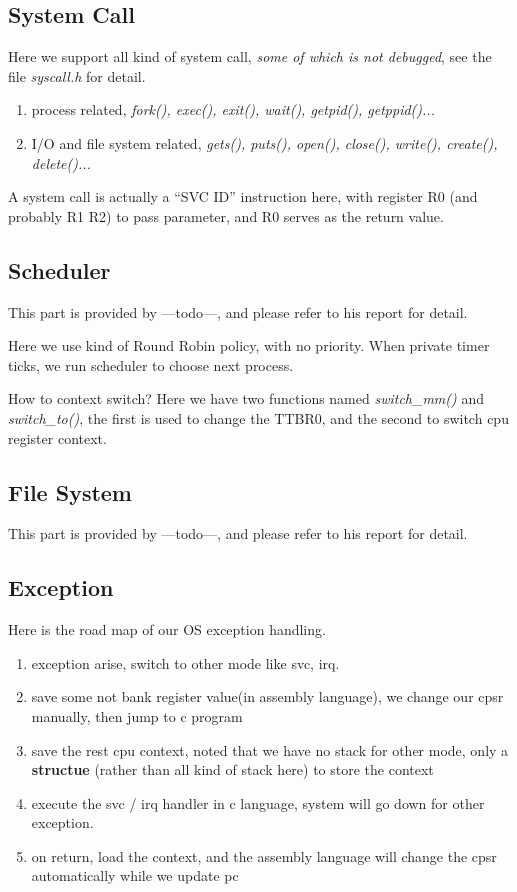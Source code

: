\documentclass{article}
\begin{document}
\subsection{System Call}
Here we support all kind of system call, \emph{some of which is not debugged}, see the file \emph{syscall.h} for detail.

\begin{enumerate}
	\item	process related, \emph{fork(), exec(), exit(), wait(), getpid(), getppid()...}
	\item I/O and file system related, \emph{gets(), puts(), open(), close(), write(), create(), delete()...}
\end{enumerate}

A system call is actually a ``SVC ID'' instruction here, with register R0 (and probably R1 R2) to pass parameter, and R0 serves as the return value.

\subsection{Scheduler}
This part is provided by ---todo---, and please refer to his report for detail.

Here we use kind of Round Robin policy, with no priority. When private timer ticks, we run scheduler to choose next process.

How to context switch? Here we have two functions named \emph{switch\_mm()} and \emph{switch\_to()}, the first is used to change the TTBR0, and the second to switch cpu register context.

\subsection{File System}

This part is provided by ---todo---, and please refer to his report for detail.


\subsection{Exception}

Here is the road map of our OS exception handling.

\begin{enumerate}
	\item	exception arise, switch to other mode like svc, irq.
	\item	save some not bank register value(in assembly language), we change our cpsr manually, then jump to c program
	\item	save the rest cpu context, noted that we have no stack for other mode, only a \textbf{structue} (rather than all kind of stack here) to store the context
	\item	execute the svc / irq handler in c language, system will go down for other exception.
	\item	on return, load the context, and the assembly language will change the cpsr automatically while we update pc
\end{enumerate}
\end{document}
